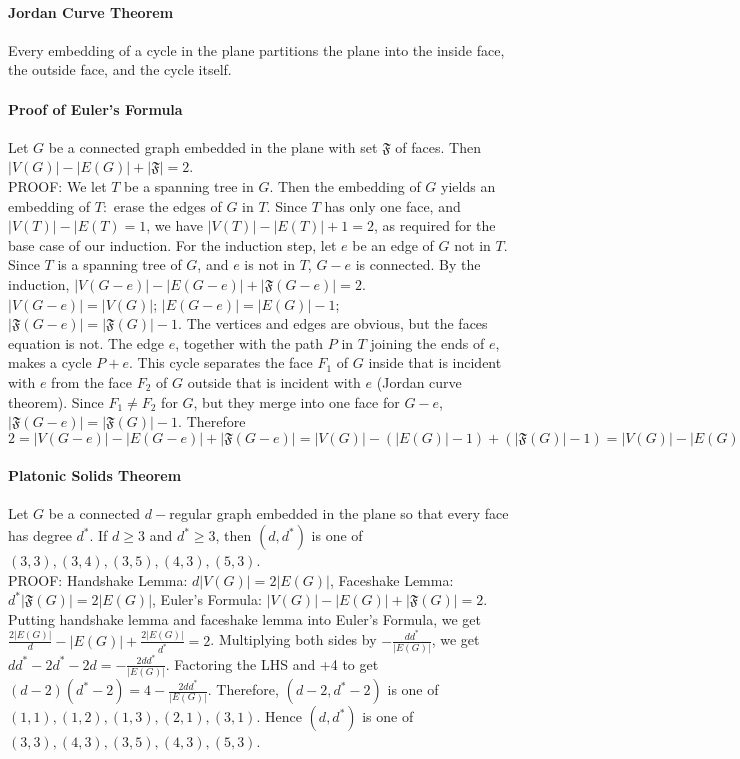 \documentclass[10pt,letter]{article}
\begin{document}
\paragraph{Jordan Curve Theorem}
Every embedding of a cycle in the plane partitions the plane into the inside face, the outside face, and the cycle itself. 

\paragraph{Proof of Euler's Formula}
Let $G$ be a connected graph embedded in the plane with set $\mathfrak{F}$ of faces. Then $|V(G)|-|E(G)|+|\mathfrak{F}|=2$. \\ 
PROOF: We let $T$ be a spanning tree in $G$. Then the embedding of $G$ yields an embedding of $T:$ erase the edges of $G$ in $T$. Since $T$ has only one face, and $|V(T)|-|E(T)=1$, we have $|V(T)|-|E(T)|+1=2$, as required for the base case of our induction. For the induction step, let $e$ be an edge of $G$ not in $T$. Since $T$ is a spanning tree of $G$, and $e$ is not in $T$, $G-e$ is connected. By the induction, $|V(G-e)|-|E(G-e)|+|\mathfrak{F}(G-e)|=2$. $|V(G-e)|=|V(G)|$; $|E(G-e)|=|E(G)|-1$; $|\mathfrak{F}(G-e)|=|\mathfrak{F}(G)|-1$. The vertices and edges are obvious, but the faces equation is not. The edge $e$, together with the path $P$ in $T$ joining the ends of $e$, makes a cycle $P+e$. This cycle separates the face $F_1$ of $G$ inside that is incident with $e$ from the face $F_2$ of $G$ outside that is incident with $e$ (Jordan curve theorem). Since $F_1\neq F_2$ for $G$, but they merge into one face for $G-e$, $|\mathfrak{F}(G-e)|=|\mathfrak{F}(G)|-1$. Therefore $2=|V(G-e)|-|E(G-e)|+|\mathfrak{F}(G-e)|=|V(G)|-(|E(G)|-1)+(|\mathfrak{F}(G)|-1)=|V(G)|-|E(G)|+|\mathfrak{F}(G)|$

\paragraph{Platonic Solids Theorem}
Let $G$ be a connected $d-$regular graph embedded in the plane so that every face has degree $d^*$. If $d\geq3$ and $d^*\geq3$, then $(d,d^*)$ is one of $(3,3),(3,4),(3,5),(4,3),(5,3)$. \\ 
PROOF: Handshake Lemma: $d|V(G)|=2|E(G)|$, Faceshake Lemma: $d^*|\mathfrak{F}(G)|=2|E(G)|$, Euler's Formula: $|V(G)|-|E(G)|+|\mathfrak{F}(G)|=2$. Putting handshake lemma and faceshake lemma into Euler's Formula, we get $\frac{2|E(G)|}{d}-|E(G)|+\frac{2|E(G)|}{d^*}=2$. Multiplying both sides by $-\frac{dd^*}{|E(G)|}$, we get $dd^*-2d^*-2d=-\frac{2dd^*}{|E(G)|}$. Factoring the LHS and +4 to get $(d-2)(d^*-2)=4-\frac{2dd^*}{|E(G)|}$. Therefore, $(d-2,d^*-2)$ is one of $(1,1),(1,2),(1,3),(2,1),(3,1)$. Hence $(d,d^*)$ is one of $(3,3),(4,3),(3,5),(4,3),(5,3)$. 
\end{document}
